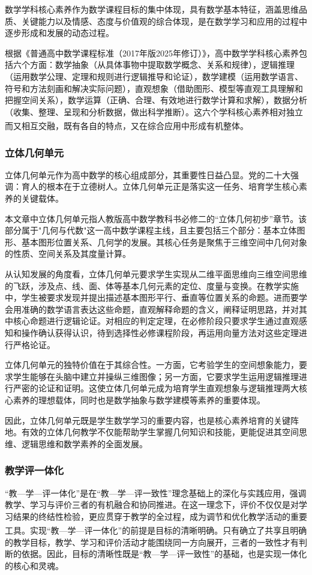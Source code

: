 \documentclass[UTF8,a4paper,12pt,twoside]{ctexart}
\begin{document}
数学学科核心素养作为数学课程目标的集中体现，具有数学基本特征，涵盖思维品质、关键能力以及情感、态度与价值观的综合体现，是在数学学习和应用的过程中逐步形成和发展的动态过程\cite{gaozhong_kebiao}。

根据《普通高中数学课程标准（2017年版2025年修订）》，高中数学学科核心素养包括六个方面：数学抽象（从具体事物中提取数学概念、关系和规律），逻辑推理（运用数学公理、定理和规则进行逻辑推导和论证），数学建模（运用数学语言、符号和方法刻画和解决实际问题），直观想象（借助图形、模型等直观工具理解和把握空间关系），数学运算（正确、合理、有效地进行数学计算和求解），数据分析（收集、整理、呈现和分析数据，做出科学推断）。这六个学科核心素养相对独立而又相互交融，既有各自的特点，又在综合应用中形成有机整体\textsuperscript{\cite{gaozhong_kebiao}}。

\subsubsection{立体几何单元}

立体几何单元作为高中数学的核心组成部分，其重要性日益凸显。党的二十大强调：育人的根本在于立德树人。立体几何单元正是落实这一任务、培育学生核心素养的关键载体。

本文章中立体几何单元指人教版高中数学教科书必修二的“立体几何初步”章节。该部分属于"几何与代数"这一高中数学课程主线，且主要包括三个部分：基本立体图形、基本图形位置关系、几何学的发展。其核心任务是聚焦于三维空间中几何对象的性质、空间关系及其度量计算。

从认知发展的角度看，立体几何单元要求学生实现从二维平面思维向三维空间思维的飞跃，涉及点、线、面、体等基本几何元素的定位、度量与变换。在教学实施中，学生被要求发现并提出描述基本图形平行、垂直等位置关系的命题。进而要学会用准确的数学语言表达这些命题，直观解释命题的含义，阐释证明思路，并对其中核心命题进行逻辑论证。对相应的判定定理，在必修阶段只要求学生通过直观感知和操作确认获得认识，待到选择性必修课程阶段，再运用向量方法对这些定理进行严格论证。

立体几何单元的独特价值在于其综合性。一方面，它考验学生的空间想象能力，要求学生能够在头脑中建立并操纵三维图像；另一方面，它要求学生运用逻辑推理进行严密的论证和证明。这使立体几何单元成为培育学生直观想象与逻辑推理两大核心素养的理想载体，同时也是数学抽象与数学建模等素养的重要体现。

因此，立体几何单元既是学生数学学习的重要内容，也是核心素养培育的关键阵地。有效的立体几何教学不仅能帮助学生掌握几何知识和技能，更能促进其空间思维、逻辑思维和数学素养的全面发展。

\subsubsection{教学评一体化}
“教—学—评一体化”是在“教—学—评一致性”理念基础上的深化与实践应用，强调教学、学习与评价三者的有机融合和协同推进。在这一理念下，评价不仅仅是对学习结果的终结性检验，更应贯穿于教学的全过程，成为调节和优化教学活动的重要工具\textsuperscript{\cite{cui_xia2013}}。实现“教—学—评一体化”的前提是目标的清晰明确。只有确立了共享且明确的教学目标，教学、学习和评价活动才能围绕同一方向展开，三者的一致性才有判断的依据。因此，目标的清晰性既是“教—学—评一致性”的基础，也是实现一体化的核心和灵魂。
\end{document}
